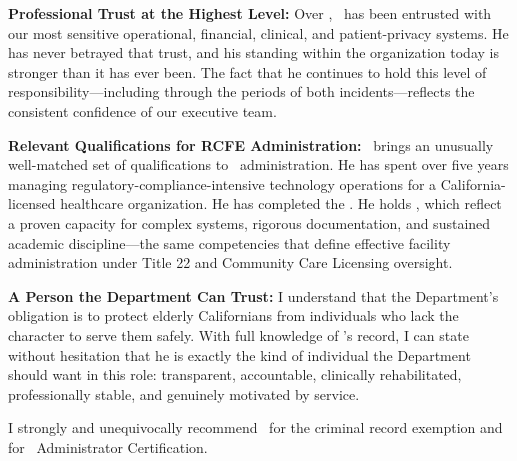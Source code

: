 \textbf{Professional Trust at the Highest Level:} Over \RefAKnownDuration, \ApplicantName\ has been entrusted with our most sensitive operational, financial, clinical, and patient-privacy systems. He has never betrayed that trust, and his standing within the organization today is stronger than it has ever been. The fact that he continues to hold this level of responsibility---including through the periods of both incidents---reflects the consistent confidence of our executive team.

\textbf{Relevant Qualifications for RCFE Administration:} \ApplicantName\ brings an unusually well-matched set of qualifications to \FacilityTypeShort\ administration. He has spent over five years managing regulatory-compliance-intensive technology operations for a California-licensed healthcare organization. He has completed the \RCFETraining. He holds \EducationDegrees, which reflect a proven capacity for complex systems, rigorous documentation, and sustained academic discipline---the same competencies that define effective facility administration under Title 22 and Community Care Licensing oversight.

\textbf{A Person the Department Can Trust:} I understand that the Department's obligation is to protect elderly Californians from individuals who lack the character to serve them safely. With full knowledge of \ApplicantName's record, I can state without hesitation that he is exactly the kind of individual the Department should want in this role: transparent, accountable, clinically rehabilitated, professionally stable, and genuinely motivated by service.

I strongly and unequivocally recommend \ApplicantName\ for the criminal record exemption and for \FacilityTypeShort\ Administrator Certification.

\licsignatureblock

